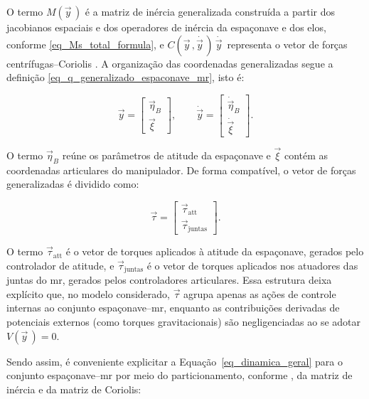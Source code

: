 O termo $M(\vec y\,)$ é a matriz de inércia generalizada construída a partir dos jacobianos espaciais
e dos operadores de inércia da espaçonave e dos elos,
conforme \eqref{eq_Ms_total_formula}, e $C(\vec y\,,\dot{\vec y\,})\,\dot{\vec y\,}$
representa o vetor de forças centrífugas--Coriolis \cite{featherstone2008,lynch2017modern}.
A organização das coordenadas generalizadas segue a definição
\eqref{eq_q_generalizado_espaconave_mr}, isto é:

\begin{equation}
\vec y
=
\begin{bmatrix}
\vec\eta_B \\
\vec\xi
\end{bmatrix},
\qquad
\dot{\vec y}
=
\begin{bmatrix}
\dot{\vec\eta}_B \\
\dot{\vec\xi}
\end{bmatrix}.
\label{eq_y_def_reprise}
\end{equation}


O termo $\vec\eta_B$ reúne os parâmetros de atitude da espaçonave e $\vec\xi$
contém as coordenadas articulares do manipulador.
De forma compatível, o vetor de forças generalizadas é dividido como:

\begin{equation}
\vec\tau
=
\begin{bmatrix}
\vec\tau_{\text{att}} \\
\vec\tau_{\text{juntas}}
\end{bmatrix}.
\label{eq_tau_estruturado_final}
\end{equation}

O termo $\vec\tau_{\text{att}}$ é o vetor de torques aplicados à atitude da
espaçonave, gerados pelo controlador de atitude, e
$\vec\tau_{\text{juntas}}$ é o vetor de torques aplicados nos atuadores
das juntas do \gls{mr}, gerados pelos controladores articulares.
Essa estrutura deixa explícito que, no modelo considerado, $\vec\tau$
agrupa apenas as ações de controle internas ao conjunto
espaçonave--\gls{mr}, enquanto as contribuições derivadas de potenciais
externos (como torques gravitacionais) são negligenciadas ao se adotar
$V(\vec y\,) = 0$.


Sendo assim, é conveniente explicitar a Equação~\eqref{eq_dinamica_geral}
para o conjunto espaçonave--\gls{mr} por meio do particionamento,
conforme \cite{featherstone2008,Wilde2018}, da matriz de inércia e da
matriz de Coriolis:

